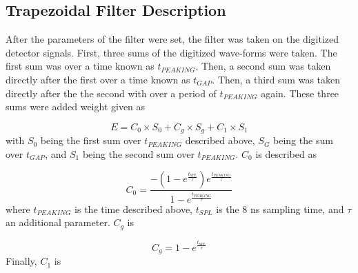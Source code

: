 \documentclass[../MaxHughesThesis.tex]{subfiles}
\begin{document}
\subsection{Trapezoidal Filter Description}
After the parameters of the filter were set, the filter was taken on the digitized detector signals.
First, three sums of the digitized wave-forms were taken.
The first sum was over a time known as $t_{PEAKING}$.
Then, a second sum was taken directly after the first over a time known as $t_{GAP}$.
Then, a third sum was taken directly after the the second with over a period of $t_{PEAKING}$ again.
These three sums were added weight given as \cite{Tan03} 

\begin{equation}
	E = C_{0} \times S_{0} + C_{g} \times S_{g} + C_{1} \times S_{1} 
	\label{eq:ensum}
\end{equation} 
%
with $S_{0}$ being the first sum over $t_{PEAKING}$ described above, $S_{G}$ being the sum over $t_{GAP}$, and $S_{1}$ being the second sum over $t_{PEAKING}$.
$C_{0}$ is described as

\begin{equation}
	C_{0} = \frac{-(1 - e^{\frac{t_{SPL}}{\tau}})e^{\frac{t_{PEAKING}}{\tau}}}{1 - e^{\frac{t_{PEAKING}}{\tau}}}
	\label{eq:c0sum}
\end{equation}
%
where $t_{PEAKING}$ is the time described above, $t_{SPL}$ is the 8 ns sampling time, and $\tau$ an additional parameter.
$C_{g}$ is 

\begin{equation}
	C_{g} = 1 - e^{\frac{t_{SPL}}{\tau}}
	\label{eq:cgsum}
\end{equation}
%
Finally, $C_{1}$ is 
\end{document}
